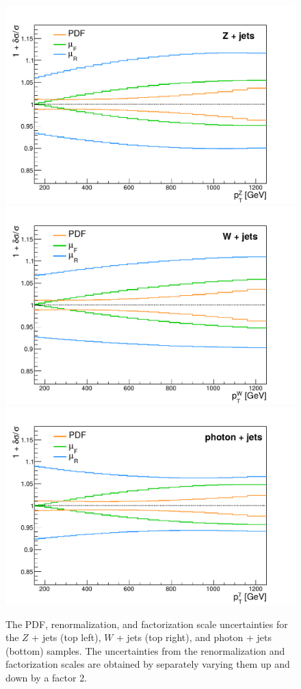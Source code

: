 \begin{figure}[p]
  \centering
 \includegraphics[width=.49\textwidth]{Z_uncertainties_smooth.pdf} 
 \includegraphics[width=.49\textwidth]{W_uncertainties_smooth_new.pdf} \\
 \includegraphics[width=.49\textwidth]{gamma_uncertainties_smooth.pdf} 
 \caption{The PDF, renormalization, and factorization scale uncertainties for the $Z$ + jets (top left), $W$ + jets (top right), and photon + jets (bottom) samples. The uncertainties from the renormalization and factorization scales are obtained by separately varying them up and down by a factor 2.}
 \label{fig:kfactors_unc}
\end{figure}

